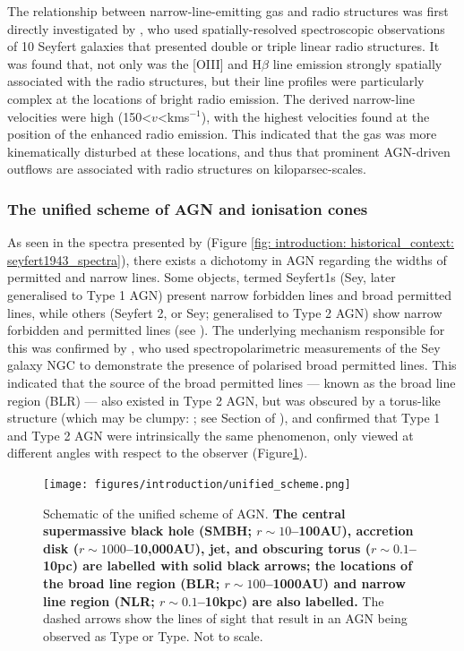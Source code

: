 The relationship between narrow-line-emitting gas and radio structures was first directly investigated by \citet{Whittle1988}, who used spatially-resolved spectroscopic observations of 10 Seyfert galaxies that presented double or triple linear radio structures. It was found that, not only was the [OIII] and H$\beta$ line emission strongly spatially associated with the radio structures, but their line profiles were particularly complex at the locations of bright radio emission. The derived narrow-line velocities were high (150\;\textless\;$v$\;\textless{}\;km\;s$^{-1}$), with the highest velocities found at the position of the enhanced radio emission. This indicated that the gas was more kinematically disturbed at these locations, and thus that prominent AGN-driven outflows are associated with radio structures on kiloparsec-scales.

\subsubsection{The unified scheme of AGN and ionisation cones}
\label{section: introduction: historical_context: nlr_studies: unified scheme}

As seen in the spectra presented by \citet{Seyfert1943} (Figure \ref{fig: introduction: historical_context: seyfert1943_spectra}), there exists a dichotomy in AGN regarding the widths of permitted and narrow lines. Some objects, termed Seyfert\;1s (Sey, later generalised to Type 1 AGN) present narrow forbidden lines and broad permitted lines, while others (Seyfert 2, or Sey; generalised to Type 2 AGN) show narrow forbidden and permitted lines (see \citealt{Khachikian1971}). The underlying mechanism responsible for this was confirmed by \citet{Antonucci1985}, who used spectropolarimetric measurements of the Sey galaxy NGC to demonstrate the presence of polarised broad permitted lines. This indicated that the source of the broad permitted lines --- known as the broad line region (BLR) --- also existed in Type 2 AGN, but was obscured by a torus-like structure (which may be clumpy: \citealt{Nenkova2002, Nenkova2008}; see Section of \citealt{Netzer2015}), and confirmed that Type 1 and Type 2 AGN were intrinsically the same phenomenon, only viewed at different angles with respect to the observer (Figure\;\ref{fig: introduction: historical_context: nlr_studies: unified_scheme}).

\begin{figure}[!ht]
    \centering
    \texttt{[image: figures/introduction/unified\_scheme.png]}
    \caption[Schematic of the unified scheme of AGN.]{Schematic of the unified scheme of AGN. \textbf{The central supermassive black hole (SMBH; $r\sim10$--100\;AU), accretion disk ($r\sim1000$--10,000\;AU), jet, and obscuring torus ($r\sim0.1$--10\;pc) are labelled with solid black arrows; the locations of the broad line region (BLR; $r\sim100$--1000\;AU) and narrow line region (NLR; $r\sim0.1$--10\;kpc) are also labelled.} The dashed arrows show the lines of sight that result in an AGN being observed as Type or Type. Not to scale.}
    \label{fig: introduction: historical_context: nlr_studies: unified_scheme}
\end{figure}

